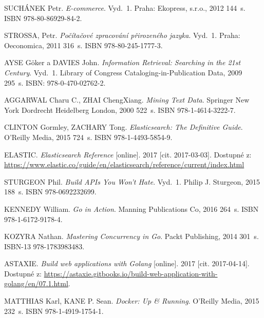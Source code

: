 \documentclass[FM,DP]{tulthesis}
\begin{document}
\begin{thebibliography}{Mm99} 


 SUCHÁNEK Petr. \emph{E-commerce}.
Vyd.~1. Praha: Ekopress, s.r.o., 2012 144~s. ISBN 978-80-86929-84-2.


 STROSSA, Petr. \emph{Počítačové zpracování přirozeného jazyka}.
Vyd.~1. Praha: Oeconomica, 2011 316~s. ISBN 978-80-245-1777-3.

 AYSE Göker a DAVIES John.
\emph{Information Retrieval: Searching in the 21st Century}.
Vyd.~1. Library of Congress Cataloging-in-Publication Data, 2009 295~s. ISBN: 978-0-470-02762-2.

 AGGARWAL Charu C., ZHAI ChengXiang. \emph{Mining Text Data}.
Springer New York Dordrecht Heidelberg London, 2000 522~s. ISBN 978-1-4614-3222-7.


 CLINTON Gormley, ZACHARY Tong. \emph{Elasticsearch: The Definitive Guide}.
O'Reilly Media, 2015 724~s. ISBN 978-1-4493-5854-9.

 ELASTIC. \emph{Elasticsearch Reference} [online].
2017 [cit. 2017-03-03]. Dostupné z:
\url{https://www.elastic.co/guide/en/elasticsearch/reference/current/index.html}


 STURGEON Phil. \emph{Build APIs You Won't Hate}.
Vyd.~1. Philip J. Sturgeon, 2015 188~s. ISBN 978-0692232699.


 KENNEDY William. \emph{Go in Action}.
Manning Publications Co, 2016 264~s. ISBN 978-1-6172-9178-4.

 KOZYRA Nathan. \emph{Mastering Concurrency in Go}.
Packt Publishing, 2014 301~s. ISBN-13 978-1783983483.

 ASTAXIE. \emph{Build web applications with Golang} [online].
2017 [cit. 2017-04-14]. Dostupné z: \url{https://astaxie.gitbooks.io/build-web-application-with-golang/en/07.1.html}.


 MATTHIAS Karl, KANE P. Sean. \emph{Docker: Up \& Running}.
O'Reilly Media, 2015 232~s. ISBN 978-1-4919-1754-1.


\end{thebibliography}
\end{document}
